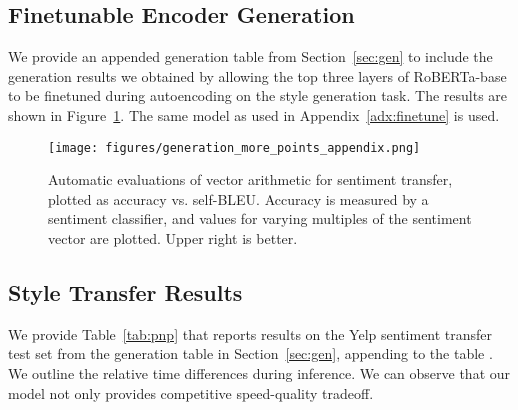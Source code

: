 \subsection{Finetunable Encoder Generation}
We provide an appended generation table from Section~\ref{sec:gen} to include the generation results we obtained by allowing the top three layers of RoBERTa-base to be finetuned during autoencoding on the style generation task. The results are shown in Figure~\ref{fig:gen_plus_finetune}. The same model as used in Appendix~\ref{adx:finetune} is used.
\begin{figure}[ht]
\centering
\hspace{-2mm}\texttt{[image: figures/generation\_more\_points\_appendix.png]} 
\caption{\label{fig:gen_plus_finetune} %
Automatic evaluations of vector arithmetic for sentiment transfer, plotted as accuracy vs. self-BLEU. Accuracy is measured by a sentiment classifier, and values for varying multiples of the sentiment vector are plotted. Upper right is better.
}
\end{figure}

\subsection{Style Transfer Results}
We provide Table~\ref{tab:pnp} that reports results on the Yelp sentiment transfer test set from the generation table in Section~\ref{sec:gen}, appending to the table \citep{mai2020plug}. We outline the relative time differences during inference. We can observe that our model not only provides competitive speed-quality tradeoff.

